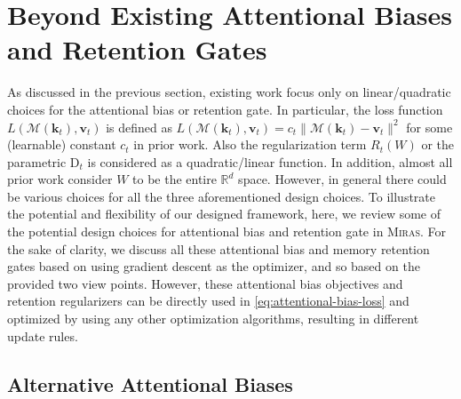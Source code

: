 \documentclass{article}
\newcommand{\framework}[0]{\textsc{Miras}}
\newcommand{\vk}[0]{\mathbf{k}}
\newcommand{\vvv}[0]{\mathbf{v}}
\newcommand{\M}[0]{\mathcal{M}}
\theoremstyle{plain}
\theoremstyle{definition}
\theoremstyle{remark}
\begin{document}
\section{Beyond Existing Attentional Biases and Retention Gates}\label{sec:beyond-variants}
As discussed in the previous section, existing work focus only on linear/quadratic choices for the attentional bias or retention gate. In particular, the loss function~$L(\M(\vk_t),\vvv_t)$ is defined as $L(\M(\vk_t),\vvv_t) = c_t\|\M(\vk_t)-\vvv_t\|^2$ for some (learnable) constant $c_t$ in prior work. Also the regularization term $R_t(W)$ or the parametric $\mbox{D}_t$ is considered as a quadratic/linear function. In addition, almost all prior work consider $W$ to be the entire $\mathbb{R}^d$ space. However, in general there could be various choices for all the three aforementioned design choices. To illustrate the potential and flexibility of our designed framework, here, we review some of the potential design choices for attentional bias and retention gate in \framework. For the sake of clarity, we discuss all these attentional bias and memory retention gates based on using gradient descent as the optimizer, and so based on the provided two view points. However, these attentional bias objectives and retention regularizers can be directly used in \autoref{eq:attentional-bias-loss} and optimized by using any other optimization algorithms, resulting in different update rules.  

\subsection{Alternative Attentional Biases}
\end{document}
